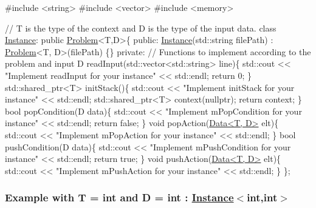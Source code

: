 \begin{DoxyCode}
\textcolor{preprocessor}{#include <string>}
\textcolor{preprocessor}{#include <vector>}
\textcolor{preprocessor}{#include <memory>}

\textcolor{comment}{// T is the type of the context and D is the type of the input data.}
\textcolor{keyword}{class }\hyperlink{class_instance}{Instance}: \textcolor{keyword}{public} \hyperlink{class_problem}{Problem}<T,D>\{
\textcolor{keyword}{public}:
  \hyperlink{class_instance}{Instance}(std::string filePath) : \hyperlink{class_problem}{Problem}<T, D>(filePath) \{\}
\textcolor{keyword}{private}:
  \textcolor{comment}{// Functions to implement according to the problem and input}
  D readInput(std::vector<std::string> line)\{
    std::cout << \textcolor{stringliteral}{"Implement readInput for your instance"} << std::endl;
    \textcolor{keywordflow}{return} 0;
  \}
  std::shared\_ptr<T> initStack()\{
    std::cout << \textcolor{stringliteral}{"Implement initStack for your instance"} << std::endl;
    std::shared\_ptr<T> context(\textcolor{keyword}{nullptr});
    \textcolor{keywordflow}{return} context;
  \}
  \textcolor{keywordtype}{bool} popCondition(D data)\{
    std::cout << \textcolor{stringliteral}{"Implement mPopCondition for your instance"} << std::endl;
    \textcolor{keywordflow}{return} \textcolor{keyword}{false};
  \}
  \textcolor{keywordtype}{void} popAction(\hyperlink{class_data}{Data<T, D>} elt)\{
    std::cout << \textcolor{stringliteral}{"Implement mPopAction for your instance"} << std::endl;
  \}
  \textcolor{keywordtype}{bool} pushCondition(D data)\{
    std::cout << \textcolor{stringliteral}{"Implement mPushCondition for your instance"} << std::endl;
    \textcolor{keywordflow}{return} \textcolor{keyword}{true};
  \}
  \textcolor{keywordtype}{void} pushAction(\hyperlink{class_data}{Data<T, D>} elt)\{
    std::cout << \textcolor{stringliteral}{"Implement mPushAction for your instance"} << std::endl;
  \}
\};
\end{DoxyCode}


\subsubsection*{Example with {\ttfamily T = int} and {\ttfamily D = int} \+: {\ttfamily \hyperlink{class_instance}{Instance}$<$int,int$>$}}

